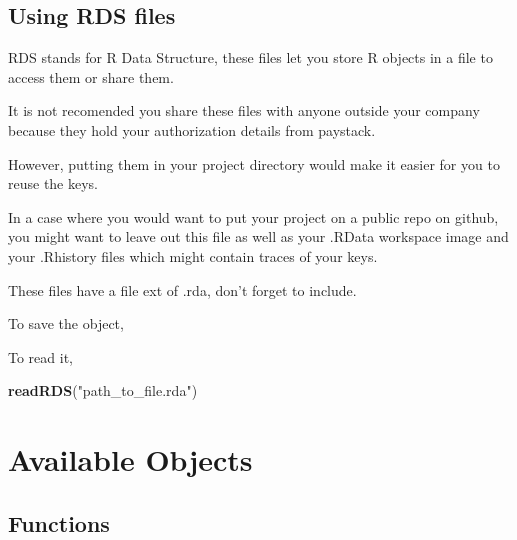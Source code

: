 \documentclass[]{book}
\newenvironment{Shaded}{\begin{snugshade}}{\end{snugshade}}
\newcommand{\KeywordTok}[1]{\textcolor[rgb]{0.13,0.29,0.53}{\textbf{#1}}}
\newcommand{\StringTok}[1]{\textcolor[rgb]{0.31,0.60,0.02}{#1}}
\newcommand{\OperatorTok}[1]{\textcolor[rgb]{0.81,0.36,0.00}{\textbf{#1}}}
\newcommand{\NormalTok}[1]{#1}
\begin{document}
\section{Using RDS files}\label{using-rds-files}

RDS stands for R Data Structure, these files let you store R objects in
a file to access them or share them.

It is not recomended you share these files with anyone outside your
company because they hold your authorization details from paystack.

However, putting them in your project directory would make it easier for
you to reuse the keys.

In a case where you would want to put your project on a public repo on
github, you might want to leave out this file as well as your .RData
workspace image and your .Rhistory files which might contain traces of
your keys.

These files have a file ext of .rda, don't forget to include.

To save the object,

\begin{Shaded}
\end{Shaded}

To read it,

\begin{Shaded}
\begin{Highlighting}[]
\KeywordTok{readRDS}\NormalTok{(}\StringTok{"path_to_file.rda"}\NormalTok{)}
\end{Highlighting}
\end{Shaded}

\chapter{Available Objects}\label{available-objects}

\section{Functions}\label{functions}
\end{document}
